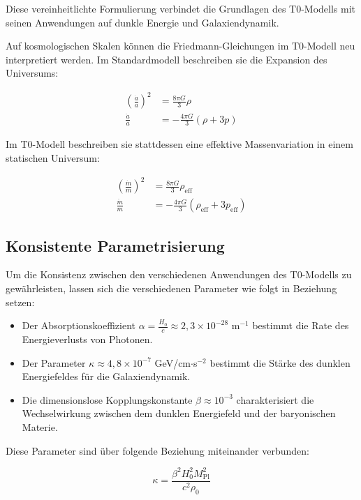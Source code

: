 \documentclass[a4paper,12pt]{article}
\theoremstyle{definition}
\theoremstyle{remark}
\begin{document}
	Diese vereinheitlichte Formulierung verbindet die Grundlagen des T0-Modells mit seinen Anwendungen auf dunkle Energie und Galaxiendynamik.
	
	Auf kosmologischen Skalen können die Friedmann-Gleichungen im T0-Modell neu interpretiert werden. Im Standardmodell beschreiben sie die Expansion des Universums:
	
	\begin{align}
		\left(\frac{\dot{a}}{a}\right)^2 &= \frac{8\pi G}{3}\rho \\
		\frac{\ddot{a}}{a} &= -\frac{4\pi G}{3}(\rho + 3p)
	\end{align}
	
	Im T0-Modell beschreiben sie stattdessen eine effektive Massenvariation in einem statischen Universum:
	
	\begin{align}
		\left(\frac{\dot{m}}{m}\right)^2 &= \frac{8\pi G}{3}\rho_{\text{eff}} \\
		\frac{\ddot{m}}{m} &= -\frac{4\pi G}{3}(\rho_{\text{eff}} + 3p_{\text{eff}})
	\end{align}
	
	\subsection{Konsistente Parametrisierung}
	
	Um die Konsistenz zwischen den verschiedenen Anwendungen des T0-Modells zu gewährleisten, lassen sich die verschiedenen Parameter wie folgt in Beziehung setzen:
	
	\begin{itemize}
		\item Der Absorptionskoeffizient $\alpha = \frac{H_{0}}{c} \approx 2{,}3 \times 10^{-28}$ m$^{-1}$ bestimmt die Rate des Energieverlusts von Photonen.
		\item Der Parameter $\kappa \approx 4{,}8 \times 10^{-7}$ GeV/cm$\cdot$s$^{-2}$ bestimmt die Stärke des dunklen Energiefeldes für die Galaxiendynamik.
		\item Die dimensionslose Kopplungskonstante $\beta \approx 10^{-3}$ charakterisiert die Wechselwirkung zwischen dem dunklen Energiefeld und der baryonischen Materie.
	\end{itemize}
	
	Diese Parameter sind über folgende Beziehung miteinander verbunden:
	
	\begin{equation}
		\kappa = \frac{\beta^2 H_0^2 M_{\text{Pl}}^2}{c^2 \rho_0}
	\end{equation}
	
\end{document}
